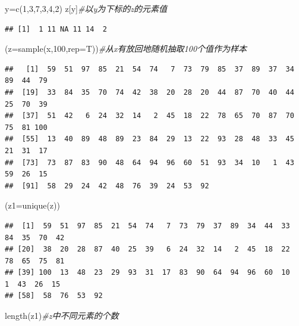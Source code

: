 \documentclass[
]{book}
\newenvironment{Shaded}{\begin{snugshade}}{\end{snugshade}}
\newcommand{\AttributeTok}[1]{\textcolor[rgb]{0.77,0.63,0.00}{#1}}
\newcommand{\CommentTok}[1]{\textcolor[rgb]{0.56,0.35,0.01}{\textit{#1}}}
\newcommand{\DecValTok}[1]{\textcolor[rgb]{0.00,0.00,0.81}{#1}}
\newcommand{\FunctionTok}[1]{\textcolor[rgb]{0.00,0.00,0.00}{#1}}
\newcommand{\NormalTok}[1]{#1}
\newcommand{\OtherTok}[1]{\textcolor[rgb]{0.56,0.35,0.01}{#1}}
\begin{document}
\begin{Shaded}
\begin{Highlighting}[]
\NormalTok{y}\OtherTok{=}\FunctionTok{c}\NormalTok{(}\DecValTok{1}\NormalTok{,}\DecValTok{3}\NormalTok{,}\DecValTok{7}\NormalTok{,}\DecValTok{3}\NormalTok{,}\DecValTok{4}\NormalTok{,}\DecValTok{2}\NormalTok{)}
\NormalTok{z[y]}\CommentTok{\#以y为下标的z的元素值}
\end{Highlighting}
\end{Shaded}

\begin{verbatim}
## [1]  1 11 NA 11 14  2
\end{verbatim}

\begin{Shaded}
\begin{Highlighting}[]
\NormalTok{(}\AttributeTok{z=}\FunctionTok{sample}\NormalTok{(x,}\DecValTok{100}\NormalTok{,}\AttributeTok{rep=}\NormalTok{T))}\CommentTok{\#从x有放回地随机抽取100个值作为样本}
\end{Highlighting}
\end{Shaded}

\begin{verbatim}
##   [1]  59  51  97  85  21  54  74   7  73  79  85  37  89  37  34  89  44  79
##  [19]  33  84  35  70  74  42  38  20  28  20  44  87  70  40  44  25  70  39
##  [37]  51  42   6  24  32  14   2  45  18  22  78  65  70  87  70  75  81 100
##  [55]  13  40  89  48  89  23  84  29  13  22  93  28  48  33  45  21  31  17
##  [73]  73  87  83  90  48  64  94  96  60  51  93  34  10   1  43  59  26  15
##  [91]  58  29  24  42  48  76  39  24  53  92
\end{verbatim}

\begin{Shaded}
\begin{Highlighting}[]
\NormalTok{(}\AttributeTok{z1=}\FunctionTok{unique}\NormalTok{(z))}
\end{Highlighting}
\end{Shaded}

\begin{verbatim}
##  [1]  59  51  97  85  21  54  74   7  73  79  37  89  34  44  33  84  35  70  42
## [20]  38  20  28  87  40  25  39   6  24  32  14   2  45  18  22  78  65  75  81
## [39] 100  13  48  23  29  93  31  17  83  90  64  94  96  60  10   1  43  26  15
## [58]  58  76  53  92
\end{verbatim}

\begin{Shaded}
\begin{Highlighting}[]
\FunctionTok{length}\NormalTok{(z1)}\CommentTok{\#z中不同元素的个数}
\end{Highlighting}
\end{Shaded}
\end{document}
